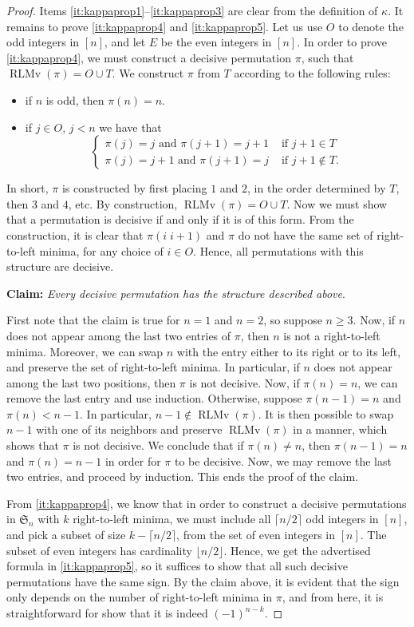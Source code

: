 \documentclass[reqno]{amsart}
\theoremstyle{definition}
\newcommand{\symS}{\mathfrak{S}}
\DeclareMathOperator{\RLMv}{RLMv}
\begin{document}
\begin{proof}
Items \ref{it:kappaprop1}--\ref{it:kappaprop3} are clear from the definition of $\kappa$.
%
It remains to prove \ref{it:kappaprop4} and \ref{it:kappaprop5}.
Let us use $O$ to denote the odd integers in $[n]$, and let $E$
be the even integers in $[n]$.
%
In order to prove \ref{it:kappaprop4}, we must construct a decisive permutation $\pi$,
such that $\RLMv(\pi) = O \cup T$. We construct $\pi$ from $T$
according to the following rules:
\begin{itemize}
\item if $n$ is odd, then $\pi(n)=n$.
\item if $j \in O$, $j<n$ we have that
\[
\begin{cases}
\pi(j) =j \text{ and } \pi(j+1) = j+1 &\text{ if } j+1 \in T \\
\pi(j) =j+1 \text{ and } \pi(j+1) = j &\text{ if } j+1 \notin T.
\end{cases}
\]
\end{itemize}
In short, $\pi$ is constructed by first placing $1$ and $2$,
in the order determined by $T$, then $3$ and $4$, etc.
By construction, $\RLMv(\pi) = O \cup T$.
Now we must show that a permutation is decisive if and only if it is of this form. From the construction, it is clear that
$\pi (i\; i+1)$ and $\pi$ do not have the same set of right-to-left minima,
for any choice of $i \in O$. Hence, all permutations with this structure are decisive.
\medskip

\textbf{Claim:} \emph{Every decisive permutation has the structure described above}.

First note that the claim is true for $n=1$ and $n=2$, so suppose $n\geq 3$.
Now, if $n$ does not appear among the last two entries of $\pi$,
then $n$ is not a right-to-left minima. Moreover, we can swap $n$ 
with the entry either to its right or to its left, and preserve the 
set of right-to-left minima. 
In particular, if $n$ does not appear among the last two positions,
then $\pi$ is not decisive. Now, if $\pi(n)=n$, we can remove 
the last entry and use induction.
Otherwise, suppose $\pi(n-1)=n$ and $\pi(n)<n-1$. In particular,
$n-1 \notin \RLMv(\pi)$.
It is then possible to swap $n-1$ with one of its neighbors and preserve $\RLMv(\pi)$ in a manner, which shows that $\pi$ is not decisive.  We conclude that if 
$\pi(n) \neq n$, then $\pi(n-1)=n$ and $\pi(n)=n-1$ in order for $\pi$
to be decisive. Now, we may remove the last two entries,
and proceed by induction. This ends the proof of the claim.
\smallskip 


From \ref{it:kappaprop4}, we know that in order to 
construct a decisive permutations in $\symS_n$ with $k$ right-to-left minima,
we must include all $\lceil n/2 \rceil$ odd integers in $[n]$,
and pick a subset of size $k  - \lceil n/2 \rceil$,
from the set of even integers in $[n]$.
The subset of even integers has cardinality $\lfloor n/2 \rfloor$.
Hence, we get the advertised formula in 
\ref{it:kappaprop5}, so it suffices to show that all such
decisive permutations have the same sign.
By the claim above, it is evident that 
the sign only depends on the number of right-to-left minima in $\pi$,
and from here, it is straightforward for show that it is indeed
$(-1)^{n-k}$.
\end{proof}
\end{document}
